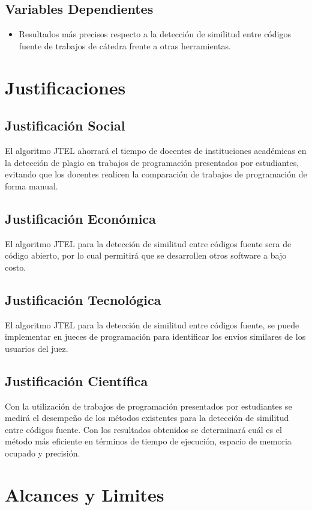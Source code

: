 \subsection{Variables Dependientes}
\begin{itemize}
    \item Resultados más precisos respecto a la detección de similitud entre códigos fuente de trabajos de cátedra frente a otras herramientas.
\end{itemize}
\section{Justificaciones}
\subsection{Justificación Social}
El algoritmo JTEL ahorrará el tiempo de docentes de instituciones académicas en la detección de plagio en trabajos de programación presentados por estudiantes, evitando que los docentes realicen la comparación de trabajos de programación de forma manual.
\subsection{Justificación Económica}
El algoritmo JTEL para la detección de similitud entre códigos fuente sera de código abierto, por lo cual permitirá que se desarrollen otros software a bajo costo.
\subsection{Justificación Tecnológica}
El algoritmo JTEL para la detección de similitud entre códigos fuente, se puede implementar en jueces de programación para identificar los envíos similares de los usuarios del juez.
\subsection{Justificación Científica}
Con la utilización de trabajos de programación presentados por estudiantes se medirá el desempeño de los métodos existentes para la detección de similitud entre códigos fuente. Con los resultados obtenidos se determinará cuál es el método más eficiente en términos de tiempo de ejecución, espacio de memoria ocupado y precisión.
\section{Alcances y Limites}
